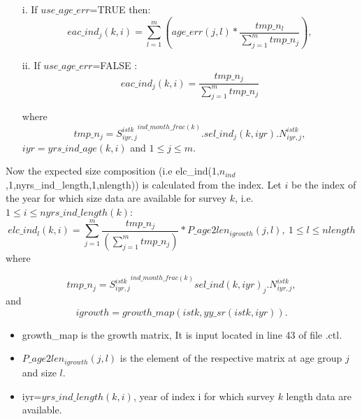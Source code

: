 \documentclass{article}
\begin{document}
\begin{itemize}
        \item [i.] If $use\_age\_err$=TRUE then: 
    \begin{equation}
        eac\_ind_j(k,i)=\sum_{l=1}^m \left(age\_err(j,l)*\dfrac{tmp\_n_l}{\sum_{j=1}^mtmp\_n_j}\right),
    \end{equation}
        \item [ii.] If $use\_age\_err$=FALSE :
        \begin{equation}eac\_ind_j(k,i)=\dfrac{tmp\_n_j}{\sum_{j=1}^mtmp\_n_j}
    \end{equation}

where \begin{equation}
    tmp\_n_j= {S^{istk}_{iyr,j}}^{ind\_month\_frac(k)}.sel\_ind_j(k,iyr).N^{istk}_{iyr,j},
\end{equation}
 $iyr=yrs\_ind\_age(k,i)$ and $1\leq j\leq m$.
    \end{itemize}

Now the expected size composition (i.e elc\_ind(1,$n_{ind}$,1,nyrs\_ind\_length,1,nlength)) is calculated from the index. Let $i$ be the index of the year for which size data are available for survey $k$, i.e.   $1\leq i \leq nyrs\_ind\_length(k)$:
\begin{equation}
    elc\_ind_l(k,i)=\sum_{j=1}^m\dfrac{tmp\_n_j}{\left(\displaystyle\sum_{j=1}^mtmp\_n_j\right)}*P\_age2len_{igrowth}(j,l), \ 1\leq l \leq nlength
\end{equation}
where

\begin{equation}
    tmp\_n_j= {S^{istk}_{iyr,j}}^{ind\_month\_frac(k)}sel\_ind(k,iyr)_j.N^{istk}_{iyr,j},
\end{equation}
and
\begin{equation}
    igrowth=growth\_map(istk,yy\_sr(istk,iyr)).    
\end{equation}

\begin{itemize}
    \item growth\_map is the growth matrix, It is input located in line 43 of file .ctl.
    \item $P\_age2len_{igrowth}(j,l)$ is the element of the respective matrix at age group $j$ and size $l$.
    \item iyr=$yrs\_ind\_length(k,i)$, year of index i for which survey $k$ length data are available.
    
    \end{itemize}
    
\end{document}
